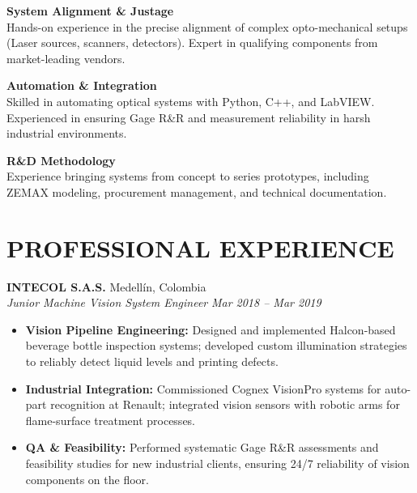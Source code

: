\documentclass[a4paper,10pt]{article}
\newcommand{\entry}[4]{
  \textbf{#1} \hfill #2 \\
  \textit{#3} \hfill \textit{#4} \\
}
\begin{document}
\vspace{6pt}

\textbf{System Alignment \& Justage} \\
Hands-on experience in the precise alignment of complex opto-mechanical setups (Laser sources, scanners, detectors). Expert in qualifying components from market-leading vendors. 

\vspace{6pt}

\textbf{Automation \& Integration} \\
Skilled in automating optical systems with Python, C++, and LabVIEW. Experienced in ensuring Gage R\&R and measurement reliability in harsh industrial environments. 

\vspace{6pt}

\textbf{R\&D Methodology} \\
Experience bringing systems from concept to series prototypes, including ZEMAX modeling, procurement management, and technical documentation. 

\vspace{6pt}


\section{PROFESSIONAL EXPERIENCE}


\entry{INTECOL S.A.S.}{Medellín, Colombia}{Junior Machine Vision System Engineer}{Mar 2018 -- Mar 2019}
\begin{itemize}[leftmargin=*, topsep=2pt, itemsep=1pt, parsep=1pt]
    
    \item \textbf{Vision Pipeline Engineering:} Designed and implemented Halcon-based beverage bottle inspection systems; developed custom illumination strategies to reliably detect liquid levels and printing defects.
    
    \item \textbf{Industrial Integration:} Commissioned Cognex VisionPro systems for auto-part recognition at Renault; integrated vision sensors with robotic arms for flame-surface treatment processes.
    
    \item \textbf{QA \& Feasibility:} Performed systematic Gage R\&R assessments and feasibility studies for new industrial clients, ensuring 24/7 reliability of vision components on the floor.
    
\end{itemize}
\end{document}
